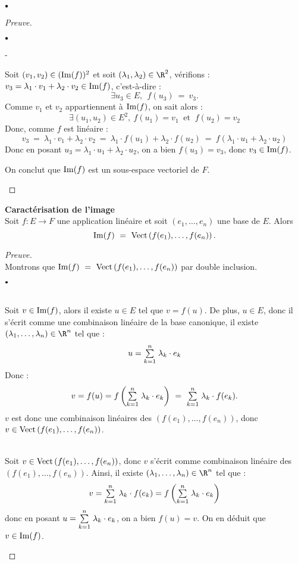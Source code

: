 \documentclass[11pt]{article}%
\begin{document}
\begin{noliste}{$\scriptstyle \bullet$}
\begin{proof}[Preuve]
\begin{noliste}{$\scriptstyle \bullet$}
\begin{noliste}{-}
        \item Soit $(v_1,v_2) \in (\operatorname{Im}(f))^2$ et soit $(\lambda_1,
        \lambda_2)\in \R^2$, vérifions : 
        $v_3= \lambda_1 \cdot v_1 + \lambda_2 \cdot v_2 \in \operatorname{Im}(f)$, 
        c'est-à-dire :
        \[
          \exists u_3 \in E, \ \ f(u_3) \ = \ v_3.
        \]
        Comme $v_1$ et $v_2$ appartiennent à $\operatorname{Im}(f)$, on sait alors :
        \[
          \exists (u_1,u_2) \in E^2, \ f(u_1) = v_1 \ \text{ et } \ 
          f(u_2) =v_2
        \]
        Donc, comme $f$ est linéaire :
        \[
          v_3 \ = \ \lambda_1 \cdot v_1 + \lambda_2 \cdot v_2 \ = \ 
          \lambda_1 \cdot f(u_1) + \lambda_2 \cdot f(u_2) \ = \ 
          f(\lambda_1 \cdot u_1 + \lambda_2 \cdot u_2)
        \]
        Donc en posant $u_3 = \lambda_1 \cdot u_1 + \lambda_2 \cdot 
        u_2$, on a bien $f(u_3) = v_3$, donc $v_3 \in \operatorname{Im}(f)$. 
      \end{noliste}
      On conclut que $\operatorname{Im}(f)$ est un sous-espace vectoriel de $F$.
  \end{noliste}
\end{proof}


\newpage


\item {\bf Caractérisation de l'image}\\
Soit $f : E \to F$ une application linéaire et soit $(e_1,\ldots,e_n)$ 
une base de $E$. Alors
\[
\operatorname{Im}(f) \ = \ {\rm{Vect}}\left( f(e_1),\ldots,f(e_n)\right).
\]

\begin{proof}[Preuve]~\\
Montrons que $\operatorname{Im}(f) \ = \ {\rm{Vect}}\left( f(e_1),\ldots,f(e_n)\right)$ par 
double inclusion.
\begin{noliste}{$\scriptstyle \bullet$}
  \item {} 
  \\[.2cm]
  Soit $v \in \operatorname{Im}(f)$, alors il existe $u\in E$ tel que $v=f(u)$. De 
  plus, $u \in E$, donc il s'écrit comme une combinaison linéaire de la 
  base canonique, \ie il existe $(\lambda_1,\ldots,\lambda_n)\in\R^n$ 
  tel que :
  \[
    u = {\textstyle\sum\limits_{k=1}^{n}}\hspace{.1cm} \lambda_k \cdot e_k
  \]
  Donc : 
  \[
    v = f(u) = f\left( \Sum{k=1}{n} \lambda_k \cdot e_k \right) \ 
    = \ \Sum{k=1}{n} \lambda_k \cdot f(e_k) .
  \]
  $v$ est donc une combinaison linéaires des $(f(e_1),\ldots,f(e_n))$, 
  donc $v \in {\rm{Vect}}\left(f(e_1),\ldots,f(e_n)\right)$.
  
  \item {} 
  \\[.2cm]
  Soit $v \in {\rm{Vect}}\left(f(e_1),\ldots,f(e_n)\right)$, donc $v$ s'écrit comme 
  combinaison linéaire des $(f(e_1),\ldots,f(e_n))$. Ainsi, il existe 
  $(\lambda_1,\ldots,\lambda_n)\in\R^n$ tel que :
  \[
    v = {\textstyle\sum\limits_{k=1}^{n}}\hspace{.1cm} \lambda_k \cdot f(e_k) = f \left( {\textstyle\sum\limits_{k=1}^{n}}\hspace{.1cm} 
    \lambda_k \cdot e_k\right)
  \]
  donc en posant $u = {\textstyle\sum\limits_{k=1}^{n}}\hspace{.1cm} \lambda_k \cdot e_k$, on a bien 
  $f(u) = v$. On en déduit que $v \in \operatorname{Im}(f)$. 
\end{noliste}
\end{proof}





\end{noliste}
\end{document}
